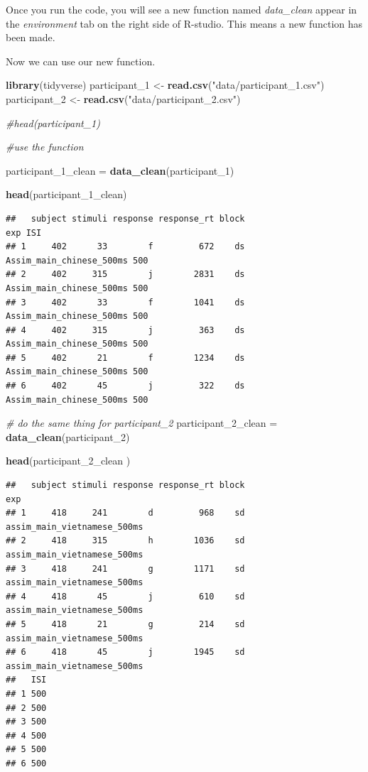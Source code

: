 \documentclass[]{book}
\newenvironment{Shaded}{\begin{snugshade}}{\end{snugshade}}
\newcommand{\KeywordTok}[1]{\textcolor[rgb]{0.13,0.29,0.53}{\textbf{#1}}}
\newcommand{\DecValTok}[1]{\textcolor[rgb]{0.00,0.00,0.81}{#1}}
\newcommand{\StringTok}[1]{\textcolor[rgb]{0.31,0.60,0.02}{#1}}
\newcommand{\CommentTok}[1]{\textcolor[rgb]{0.56,0.35,0.01}{\textit{#1}}}
\newcommand{\NormalTok}[1]{#1}
\begin{document}
Once you run the code, you will see a new function named
\emph{data\_clean} appear in the \emph{environment} tab on the right
side of R-studio. This means a new function has been made.

Now we can use our new function.

\begin{Shaded}
\begin{Highlighting}[]
\KeywordTok{library}\NormalTok{(tidyverse)}
\NormalTok{participant_}\DecValTok{1}\NormalTok{ <-}\StringTok{ }\KeywordTok{read.csv}\NormalTok{(}\StringTok{"data/participant_1.csv"}\NormalTok{)}
\NormalTok{participant_}\DecValTok{2}\NormalTok{ <-}\StringTok{ }\KeywordTok{read.csv}\NormalTok{(}\StringTok{"data/participant_2.csv"}\NormalTok{)}

\CommentTok{#head(participant_1)}

\CommentTok{#use the function}

\NormalTok{participant_1_clean =}\StringTok{ }\KeywordTok{data_clean}\NormalTok{(participant_}\DecValTok{1}\NormalTok{)}

\KeywordTok{head}\NormalTok{(participant_1_clean)}
\end{Highlighting}
\end{Shaded}

\begin{verbatim}
##   subject stimuli response response_rt block                      exp ISI
## 1     402      33        f         672    ds Assim_main_chinese_500ms 500
## 2     402     315        j        2831    ds Assim_main_chinese_500ms 500
## 3     402      33        f        1041    ds Assim_main_chinese_500ms 500
## 4     402     315        j         363    ds Assim_main_chinese_500ms 500
## 5     402      21        f        1234    ds Assim_main_chinese_500ms 500
## 6     402      45        j         322    ds Assim_main_chinese_500ms 500
\end{verbatim}

\begin{Shaded}
\begin{Highlighting}[]
\CommentTok{# do the same thing for participant_2}
\NormalTok{participant_2_clean =}\StringTok{ }\KeywordTok{data_clean}\NormalTok{(participant_}\DecValTok{2}\NormalTok{)}

\KeywordTok{head}\NormalTok{(participant_2_clean )}
\end{Highlighting}
\end{Shaded}

\begin{verbatim}
##   subject stimuli response response_rt block                         exp
## 1     418     241        d         968    sd assim_main_vietnamese_500ms
## 2     418     315        h        1036    sd assim_main_vietnamese_500ms
## 3     418     241        g        1171    sd assim_main_vietnamese_500ms
## 4     418      45        j         610    sd assim_main_vietnamese_500ms
## 5     418      21        g         214    sd assim_main_vietnamese_500ms
## 6     418      45        j        1945    sd assim_main_vietnamese_500ms
##   ISI
## 1 500
## 2 500
## 3 500
## 4 500
## 5 500
## 6 500
\end{verbatim}
\end{document}
